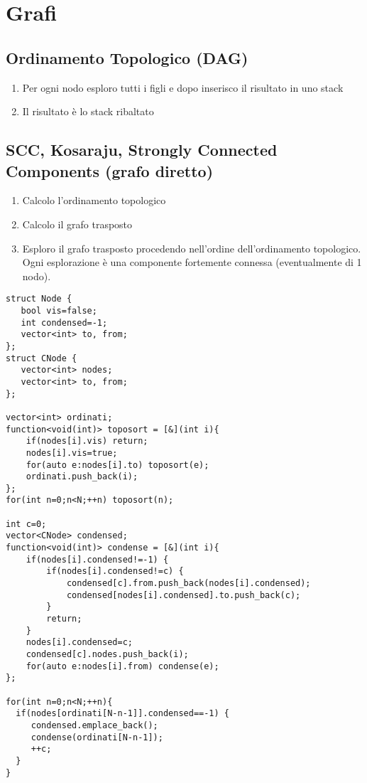 \section{Grafi}

\subsection{Ordinamento Topologico (DAG)}
\begin{enumerate}
    \item Per ogni nodo esploro tutti i figli e dopo inserisco il risultato in uno stack
    \item Il risultato è lo stack ribaltato
\end{enumerate}

\subsection{SCC, Kosaraju, Strongly Connected Components (grafo diretto)}
\begin{enumerate}
    \item Calcolo l’ordinamento topologico
    \item Calcolo il grafo trasposto
    \item Esploro il grafo trasposto procedendo nell’ordine dell’ordinamento topologico. Ogni esplorazione è una componente fortemente connessa (eventualmente di 1 nodo).
\end{enumerate}
\begin{lstlisting}
struct Node {
   bool vis=false;
   int condensed=-1;
   vector<int> to, from;
};
struct CNode {
   vector<int> nodes;
   vector<int> to, from;
};

vector<int> ordinati;
function<void(int)> toposort = [&](int i){
    if(nodes[i].vis) return;
    nodes[i].vis=true;
    for(auto e:nodes[i].to) toposort(e);
    ordinati.push_back(i);
};
for(int n=0;n<N;++n) toposort(n);

int c=0;
vector<CNode> condensed;
function<void(int)> condense = [&](int i){
    if(nodes[i].condensed!=-1) {
        if(nodes[i].condensed!=c) {
            condensed[c].from.push_back(nodes[i].condensed);
            condensed[nodes[i].condensed].to.push_back(c);
        }
        return;
    }
    nodes[i].condensed=c;
    condensed[c].nodes.push_back(i);
    for(auto e:nodes[i].from) condense(e);
};

for(int n=0;n<N;++n){
  if(nodes[ordinati[N-n-1]].condensed==-1) {
     condensed.emplace_back();
     condense(ordinati[N-n-1]);
     ++c;
  }
}
\end{lstlisting}

